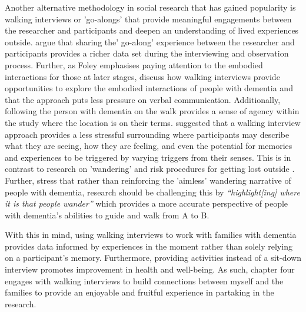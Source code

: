 Another alternative methodology in social research that has gained popularity is walking interviews or 'go-alongs' that provide meaningful engagements between the researcher and participants and deepen an understanding of lived experiences outside. \cite{hein2008mobile} argue that sharing the' go-along' experience between the researcher and participants provides a richer data set during the interviewing and observation process. Further, as Foley emphasises paying attention to the embodied interactions for those at later stages, \cite{kullberg2017walking}  discuss how walking interviews provide opportunities to explore the embodied interactions of people with dementia and that the approach puts less pressure on verbal communication. Additionally, following the person with dementia on the walk provides a sense of agency within the study where the location is on their terms. \cite{kullberg2017walking}  suggested that a walking interview approach provides a less stressful surrounding where participants may describe what they are seeing, how they are feeling, and even the potential for memories and experiences to be triggered by varying triggers from their senses. This is in contrast to research on 'wandering' and risk procedures for getting lost outside \citep{odzakovic2020verjoyed}. Further, \cite{brittain2017walking} stress that rather than reinforcing the 'aimless' wandering narrative of people with dementia, research should be challenging this by \textit{``highlight[ing] where it is that people wander''} which provides a more accurate perspective of people with dementia's abilities to guide and walk from A to B.

With this in mind, using walking interviews to work with families with dementia provides data informed by experiences in the moment rather than solely relying on a participant's memory. Furthermore, providing activities instead of a sit-down interview promotes improvement in health and well-being. As such, chapter four engages with walking interviews to build connections between myself and the families to provide an enjoyable and fruitful experience in partaking in the research.

